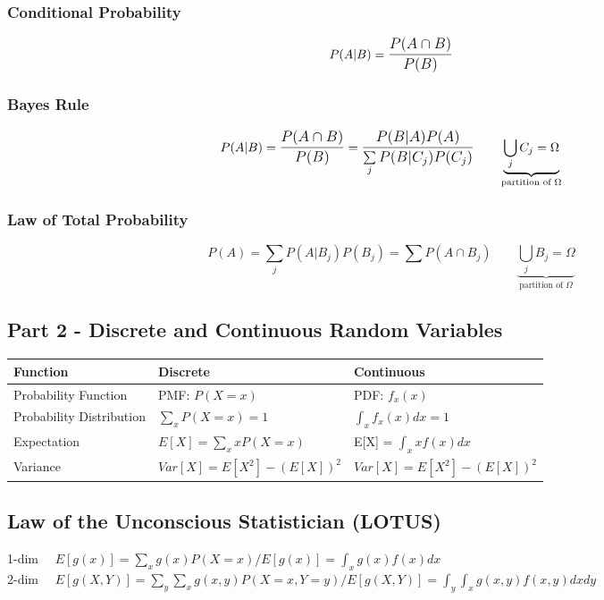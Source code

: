 \subsubsection*{Conditional Probability}
\begin{equation*}
	P(A|B) = \mathlarger{\frac{P(A \cap B)}{P(B)}}	
\end{equation*}
\subsubsection*{Bayes Rule}
\begin{equation*}
	P(A|B) = \mathlarger{\frac{P(A \cap B)}{P(B)}} = \mathlarger{\frac{P(B|A)P(A)}{\sum\limits_j P(B|C_j)P(C_j)}} \quad \quad \underbrace{\bigcup\limits_j C_j = \Omega}_{\text{partition of $\Omega$}}
\end{equation*}
\subsubsection*{Law of Total Probability}
\begin{equation*}
	P(A) = \sum\limits_j P(A|B_j) P(B_j) = \sum P(A \cap B_j) \quad \quad \underbrace{\bigcup\limits_j B_j = \Omega}_{\text{partition of $\Omega$}}
\end{equation*}
\subsection*{Part 2 - Discrete and Continuous Random Variables}
\begin{tabularx}{\textwidth}{l|X|X}
 \textbf{Function} & \textbf{Discrete} & \textbf{Continuous} \\
\hline
\hline
Probability Function & PMF: $P(X=x)$ & PDF: $f_x(x)$\\
\hline
Probability Distribution & $\sum\limits_x P(X=x) = 1$ & $\int_x f_x(x) dx = 1$\\
\hline
Expectation & $E[X] = \sum\limits_x xP(X=x)$ & E[X] = $\int_x xf(x) dx$\\
\hline
Variance & $Var[X] = E[X^2] - (E[X])^2$ & $Var[X] = E[X^2] - (E[X])^2$
\end{tabularx}
\subsection*{Law of the Unconscious Statistician (LOTUS)}
1-dim $\quad E[g(x)] = \sum\limits_x g(x) P(X=x) \bigg/ E[g(x)] = \int_x g(x)f(x)dx$\\
2-dim $\quad E[g(X,Y)] = \sum\limits_y \sum\limits_x g(x,y) P(X=x,Y=y) \bigg/ E[g(X,Y)] = \int_y \int_x g(x,y) f(x,y)dx dy$
